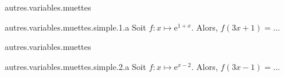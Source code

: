 \begin{qcm}{autres.variables.muettes}
  \begin{question}{autres.variables.muettes.simple.1.a}
    Soit \(f\colon x\mapsto\mathrm{e}^{1+x}\). Alors, \(f(3x+1)=\ldots\)
    \vspace{-1.5ex}
    \begin{multicols}{2}
      \begin{reponses}
      \end{reponses}
    \end{multicols}
  \end{question}
\end{qcm}


\begin{qcm}{autres.variables.muettes}
  \begin{question}{autres.variables.muettes.simple.2.a}
    Soit \(f\colon x\mapsto\mathrm{e}^{x-2}\). Alors, \(f(3x-1)=\ldots\)
    \vspace{-1.5ex}
    \begin{multicols}{2}
      \begin{reponses}
      \end{reponses}
    \end{multicols}
  \end{question}
\end{qcm}
